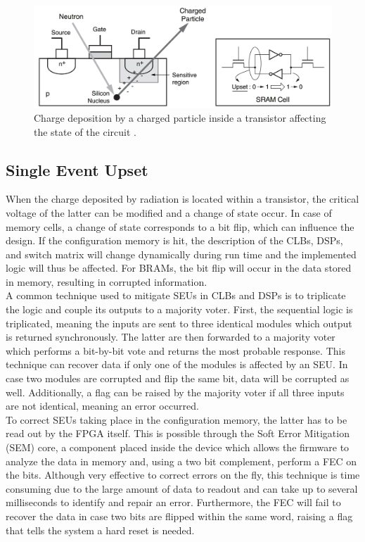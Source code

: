     \begin{figure}[h!]
      \centering
      \includegraphics[width=\textwidth]{img/II-5-irradiation/transistor.png}
      \caption{Charge deposition by a charged particle inside a transistor affecting the state of the circuit \cite{XILINX-RADIATION}.}
      \label{fig:II-5-transistor}
    \end{figure}

    \subsection{Single Event Upset}

      When the charge deposited by radiation is located within a transistor, the critical voltage of the latter can be modified and a change of state occur. In case of memory cells, a change of state corresponds to a bit flip, which can influence the design. If the configuration memory is hit, the description of the CLBs, DSPs, and switch matrix will change dynamically during run time and the implemented logic will thus be affected. For BRAMs, the bit flip will occur in the data stored in memory, resulting in corrupted information. \\

      A common technique used to mitigate SEUs in CLBs and DSPs is to triplicate the logic and couple its outputs to a majority voter. First, the sequential logic is triplicated, meaning the inputs are sent to three identical modules which output is returned synchronously. The latter are then forwarded to a majority voter which performs a bit-by-bit vote and returns the most probable response. This technique can recover data if only one of the modules is affected by an SEU. In case two modules are corrupted and flip the same bit, data will be corrupted as well. Additionally, a flag can be raised by the majority voter if all three inputs are not identical, meaning an error occurred. \\

      To correct SEUs taking place in the configuration memory, the latter has to be read out by the FPGA itself. This is possible through the Soft Error Mitigation (SEM) core, a component placed inside the device which allows the firmware to analyze the data in memory and, using a two bit complement, perform a FEC on the bits. Although very effective to correct errors on the fly, this technique is time consuming due to the large amount of data to readout and can take up to several milliseconds to identify and repair an error. Furthermore, the FEC will fail to recover the data in case two bits are flipped within the same word, raising a flag that tells the system a hard reset is needed. \\

